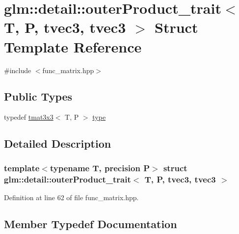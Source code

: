 \hypertarget{structglm_1_1detail_1_1outer_product__trait_3_01_t_00_01_p_00_01tvec3_00_01tvec3_01_4}{}\section{glm\+::detail\+::outer\+Product\+\_\+trait$<$ T, P, tvec3, tvec3 $>$ Struct Template Reference}
\label{structglm_1_1detail_1_1outer_product__trait_3_01_t_00_01_p_00_01tvec3_00_01tvec3_01_4}


{\ttfamily \#include $<$func\+\_\+matrix.\+hpp$>$}

\subsection*{Public Types}
\begin{DoxyCompactItemize}
\item 
typedef \mbox{\hyperlink{structglm_1_1tmat3x3}{tmat3x3}}$<$ T, P $>$ \mbox{\hyperlink{structglm_1_1detail_1_1outer_product__trait_3_01_t_00_01_p_00_01tvec3_00_01tvec3_01_4_ac6a4ba81935840a9b4e4603f0bc0e222}{type}}
\end{DoxyCompactItemize}


\subsection{Detailed Description}
\subsubsection*{template$<$typename T, precision P$>$\newline
struct glm\+::detail\+::outer\+Product\+\_\+trait$<$ T, P, tvec3, tvec3 $>$}



Definition at line 62 of file func\+\_\+matrix.\+hpp.



\subsection{Member Typedef Documentation}
\mbox{\label{structglm_1_1detail_1_1outer_product__trait_3_01_t_00_01_p_00_01tvec3_00_01tvec3_01_4_ac6a4ba81935840a9b4e4603f0bc0e222}} 
